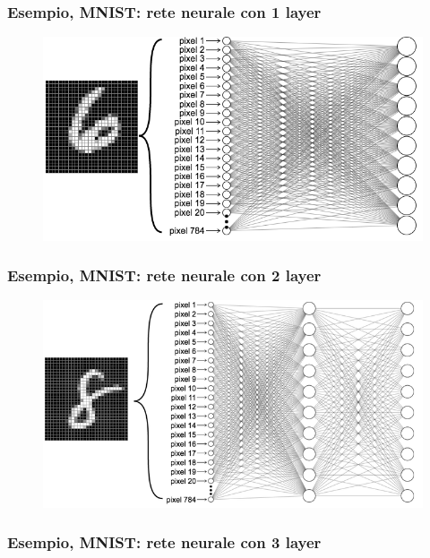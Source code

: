 \begin{frame}

	\frametitle{Esempio, MNIST: rete neurale con 1 layer}

	\begin{figure}[!htbp]
		\centering
		\includegraphics[width=1.0\linewidth]{images/supervised/z_algorithms_deep_learning/mnist_1layer.png}
	\end{figure}

\end{frame}


\begin{frame}

	\frametitle{Esempio, MNIST: rete neurale con 2 layer}

	\begin{figure}[!htbp]
		\centering
		\includegraphics[width=1.0\linewidth]{images/supervised/z_algorithms_deep_learning/mnist_2layers.png}
	\end{figure}

\end{frame}


\begin{frame}

	\frametitle{Esempio, MNIST: rete neurale con 3 layer}

		\centering

\end{frame}



